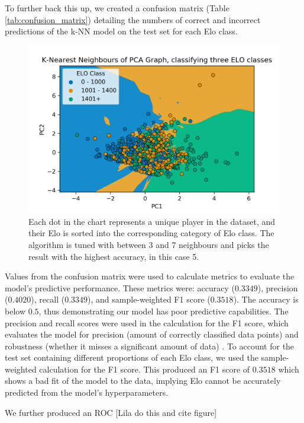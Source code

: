\documentclass[10pt,a4paper]{article}
\begin{document}
\begin{multicols}{2}
To further back this up, we created a confusion matrix (Table \ref{tab:confusion_matrix}) detailing the numbers of correct and incorrect predictions of the k-NN model on the test set for each Elo class. 
\begin{figure}[t]
  \centering
  \includegraphics[width=\textwidth]{report/images/knn_graph.png}
  \caption{Each dot in the chart represents a unique player in the dataset, and their Elo is sorted into the corresponding category of Elo class. The algorithm is tuned with between 3 and 7 neighbours and picks the result with the highest accuracy, in this case 5.}
  \label{fds-project-template:fig:knn}
\end{figure}

Values from the confusion matrix were used to calculate metrics to evaluate the model's predictive performance. These metrics were: accuracy ($0.3349$), precision ($0.4020$), recall ($0.3349$), and sample-weighted F1 score ($0.3518$). The accuracy is below $0.5$, thus demonstrating our model has poor predictive capabilities. The precision and recall scores were used in the calculation for the F1 score, which evaluates the model for precision (amount of correctly classified data points) and robustness (whether it misses a significant amount of data) \cite{MetricsToEvaluateYourML}. To account for the test set containing different proportions of each Elo class, we used the sample-weighted calculation for the F1 score. This produced an F1 score of $0.3518$ which shows a bad fit of the model to the data, implying Elo cannot be accurately predicted from the model's hyperparameters. \newline

We further produced an ROC [Lila do this and cite figure]


\end{multicols}
\end{document}
